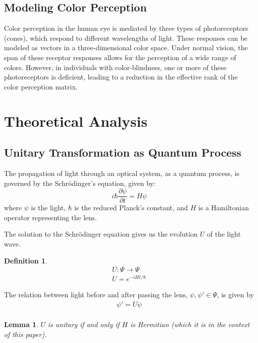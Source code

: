 \documentclass[10pt,a4paper]{article}
\newtheorem{lem}{Lemma}[section]
\theoremstyle{definition}
\newtheorem{defn}{Definition}[section]
\theoremstyle{remark}
\numberwithin{equation}{section}
\begin{document}
\subsection{Modeling Color Perception}
Color perception in the human eye is mediated by three types of photoreceptors (cones), which respond to different wavelengths of light. These responses can be modeled as vectors in a three-dimensional color space. Under normal vision, the span of these receptor responses allows for the perception of a wide range of colors. However, in individuals with color-blindness, one or more of these photoreceptors is deficient, leading to a reduction in the effective rank of the color perception matrix.

\section{Theoretical Analysis}
\subsection{Unitary Transformation as Quantum Process}
The propagation of light through an optical system, as a quantum process, is governed by the Schr\"{o}dinger's equation, given by:
\[
i\hbar \frac{\partial \psi}{\partial t} = H \psi
\]
where \( \psi \) is the light, \( \hbar \) is the reduced Planck's constant, and \( H \) is a Hamiltonian operator representing the lens.

The solution to the Schrödinger equation gives us the evolution $U$ of the light wave.
\begin{defn}
\begin{eqnarray}
U:\Psi \rightarrow \Psi\\
U = e^{-iHt/\hbar}
\end{eqnarray}
\end{defn}

The relation between light before and after passing the lens, $\psi,\psi' \in \Psi$, is given by  
\begin{eqnarray}
\psi' = U \psi \\
\end{eqnarray}
\begin{lem}
$U$ is unitary if and only if $H$ is Hermitian (which it is in the context of this paper). 
\end{lem}
\end{document}
